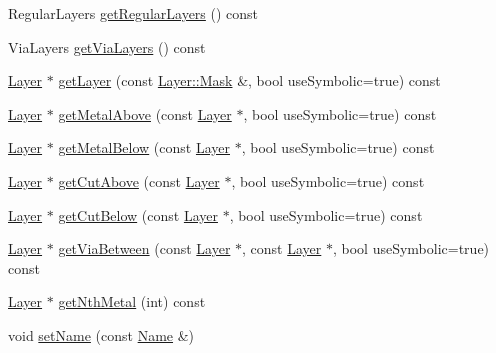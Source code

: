 \begin{DoxyCompactItemize}
\item 
Regular\+Layers \mbox{\hyperlink{classHurricane_1_1Technology_abffce542bc1cee054b4a09c64449f3b8}{get\+Regular\+Layers}} () const
\item 
Via\+Layers \mbox{\hyperlink{classHurricane_1_1Technology_aacde973f6a02a232a01f3f618576e1ee}{get\+Via\+Layers}} () const
\item 
\mbox{\hyperlink{classHurricane_1_1Layer}{Layer}} $\ast$ \mbox{\hyperlink{classHurricane_1_1Technology_a2ab8d2c386bf3daeb2b93d92ecbac6b4}{get\+Layer}} (const \mbox{\hyperlink{classHurricane_1_1Layer_af5277c670637bd5d910237e7afe01a91}{Layer\+::\+Mask}} \&, bool use\+Symbolic=true) const
\item 
\mbox{\hyperlink{classHurricane_1_1Layer}{Layer}} $\ast$ \mbox{\hyperlink{classHurricane_1_1Technology_af5723b08c9d289ffef8159ac2ea71b74}{get\+Metal\+Above}} (const \mbox{\hyperlink{classHurricane_1_1Layer}{Layer}} $\ast$, bool use\+Symbolic=true) const
\item 
\mbox{\hyperlink{classHurricane_1_1Layer}{Layer}} $\ast$ \mbox{\hyperlink{classHurricane_1_1Technology_ae02123406c7362cc14413727e8689d5a}{get\+Metal\+Below}} (const \mbox{\hyperlink{classHurricane_1_1Layer}{Layer}} $\ast$, bool use\+Symbolic=true) const
\item 
\mbox{\hyperlink{classHurricane_1_1Layer}{Layer}} $\ast$ \mbox{\hyperlink{classHurricane_1_1Technology_ac7125a8eea871918e74bb295c56caceb}{get\+Cut\+Above}} (const \mbox{\hyperlink{classHurricane_1_1Layer}{Layer}} $\ast$, bool use\+Symbolic=true) const
\item 
\mbox{\hyperlink{classHurricane_1_1Layer}{Layer}} $\ast$ \mbox{\hyperlink{classHurricane_1_1Technology_a3ca39dccc7e19b404181f55777e1b933}{get\+Cut\+Below}} (const \mbox{\hyperlink{classHurricane_1_1Layer}{Layer}} $\ast$, bool use\+Symbolic=true) const
\item 
\mbox{\hyperlink{classHurricane_1_1Layer}{Layer}} $\ast$ \mbox{\hyperlink{classHurricane_1_1Technology_a8209708bc594a307ea39f15a39bbf196}{get\+Via\+Between}} (const \mbox{\hyperlink{classHurricane_1_1Layer}{Layer}} $\ast$, const \mbox{\hyperlink{classHurricane_1_1Layer}{Layer}} $\ast$, bool use\+Symbolic=true) const
\item 
\mbox{\hyperlink{classHurricane_1_1Layer}{Layer}} $\ast$ \mbox{\hyperlink{classHurricane_1_1Technology_a81a3f3e479aeb686c61a2d0fa2931f3b}{get\+Nth\+Metal}} (int) const
\item 
void \mbox{\hyperlink{classHurricane_1_1Technology_a247b75d5cbb85198cea9e5e609304cd0}{set\+Name}} (const \mbox{\hyperlink{classHurricane_1_1Name}{Name}} \&)
\end{DoxyCompactItemize}
